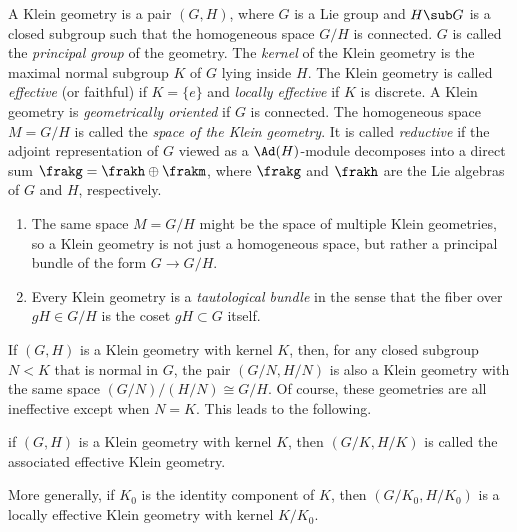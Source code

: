 \begin{defn}
    A Klein geometry is a pair $(G,H)$, where $G$ is a Lie group and $H\sub G$ is a closed subgroup such that the homogeneous space $G\slash H$ is connected. $G$ is called the \emph{principal group} of the geometry. The \emph{kernel} of the Klein geometry is the maximal normal subgroup $K$ of $G$ lying inside $H$. The Klein geometry is called \emph{effective} (or faithful) if $K=\{e\}$ and \emph{locally effective} if $K$ is discrete. A Klein geometry is \emph{geometrically oriented} if $G$ is connected. The homogeneous space $M=G\slash H$ is called the \emph{space of the Klein geometry}. It is called \emph{reductive} if the adjoint representation of $G$ viewed as a $\Ad(H)$-module decomposes into a direct sum $\frakg=\frakh\oplus \frakm$, where $\frakg$ and $\frakh$ are the Lie algebras of $G$ and $H$, respectively. 
\end{defn}

\begin{rem}
    \begin{enumerate}
        \item The same space $M=G\slash H$ might be the space of multiple Klein geometries, so a Klein geometry is not  just a homogeneous space, but rather a principal bundle of the form $G\to G\slash H$. 
        \item Every Klein geometry is a \emph{tautological bundle} in the sense that the fiber over $gH\in G\slash H$ is the coset $gH\subset G$ itself. 
    \end{enumerate}
\end{rem}



If $(G,H)$ is a Klein geometry with kernel $K$, then, for any closed subgroup $N<K$ that is normal in $G$, the pair $(G\slash N,H\slash N)$ is also a Klein geometry with the same space $(G\slash N)\slash(H\slash N)\cong G\slash H$. Of course, these geometries are all ineffective except when $N=K$. This leads to the following.

\begin{defn}
    if $(G,H)$ is a Klein geometry with kernel $K$, then $(G\slash K,H\slash K)$ is called the associated effective Klein geometry.
\end{defn}

More generally, if $K_0$ is the identity component of $K$, then $(G\slash K_0,H\slash K_0)$ is a locally effective Klein geometry with kernel $K\slash K_0$.

